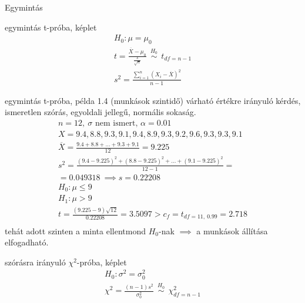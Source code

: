 \documentclass[12pt]{amsbook}
\begin{document}
\begin{spacing}{1.5}
\begin{section}{Egymintás}
\begin{subsection}{egymintás t-próba, képlet}
\label{1mtk}
   \begin{gather*}
   H_0: \mu = \mu_0\\
   t=\frac{\overline{X}-\mu_0}{\frac{s}{\sqrt{n}}} \ \ \overset{H_0}{\sim} \ \ t_{df=n-1}\\
   s^2=\frac{\sum_{i=1}^n ( X_i - \overline{ X })^2}{n-1}
   \end{gather*}
\end{subsection}%


\begin{subsection}{egymintás t-próba, példa}
\label{1mtp}
   1.4 (munkások szintidő) várható értékre irányuló kérdés, ismeretlen szórás,
   egyoldali jellegű, normális sokaság.
   \begin{gather*}
   n=12,\ \sigma \text{ nem ismert, } \alpha=0.01 \\
   X=9.4, 8.8, 9.3, 9.1, 9.4, 8.9, 9.3, 9.2, 9.6, 9.3, 9.3, 9.1\\
   \overline{X}=\frac{9.4+8.8+\ldots +9.3+9.1}{12}=9.225\\
   s^{2}=\frac{(9.4-9.225)^2+(8.8-9.225)^2+\ldots+(9.1-9.225)^2}{12-1}=\\
   =0.049318\ \implies s=0.22208\\
   H_{0}:\mu \le 9\\
   H_{1}:\mu > 9\\
   t=\frac{(9.225-9)\sqrt{12}}{0.22208}=3.5097 > c_f=t_{df=11,\ 0.99}=2.718\\
   \end{gather*}
   tehát adott szinten a minta ellentmond $H_0$-nak $\implies$ a munkások állítása elfogadható.
\end{subsection}%




\begin{subsection}{ szórásra irányuló $\chi^2$-próba, képlet }
\label{1mszk}
   \begin{gather*}
   H_0: \sigma^{2} = \sigma^{2}_{0}\\
   \chi^2=\frac{(n-1)s^2}{\sigma_0^2} \ \ \overset{H_0}{\sim} \ \ \chi^2_{df=n-1}
   \end{gather*}
\end{subsection}%



\end{section}
\end{spacing}
\end{document}

